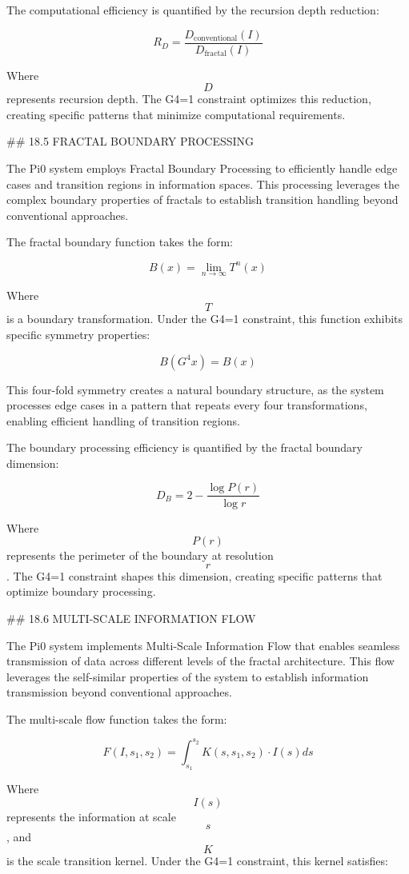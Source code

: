 The computational efficiency is quantified by the recursion depth reduction:

$$ R_D = \frac{D_{\text{conventional}}(I)}{D_{\text{fractal}}(I)} $$

Where $$ D $$ represents recursion depth. The G4=1 constraint optimizes this reduction, creating specific patterns that minimize computational requirements.

## 18.5 FRACTAL BOUNDARY PROCESSING

The Pi0 system employs Fractal Boundary Processing to efficiently handle edge cases and transition regions in information spaces. This processing leverages the complex boundary properties of fractals to establish transition handling beyond conventional approaches.

The fractal boundary function takes the form:

$$ B(x) = \lim_{n \to \infty} T^n(x) $$

Where $$ T $$ is a boundary transformation. Under the G4=1 constraint, this function exhibits specific symmetry properties:

$$ B(G^4 x) = B(x) $$

This four-fold symmetry creates a natural boundary structure, as the system processes edge cases in a pattern that repeats every four transformations, enabling efficient handling of transition regions.

The boundary processing efficiency is quantified by the fractal boundary dimension:

$$ D_B = 2 - \frac{\log P(r)}{\log r} $$

Where $$ P(r) $$ represents the perimeter of the boundary at resolution $$ r $$. The G4=1 constraint shapes this dimension, creating specific patterns that optimize boundary processing.

## 18.6 MULTI-SCALE INFORMATION FLOW

The Pi0 system implements Multi-Scale Information Flow that enables seamless transmission of data across different levels of the fractal architecture. This flow leverages the self-similar properties of the system to establish information transmission beyond conventional approaches.

The multi-scale flow function takes the form:

$$ F(I, s_1, s_2) = \int_{s_1}^{s_2} K(s, s_1, s_2) \cdot I(s) ds $$

Where $$ I(s) $$ represents the information at scale $$ s $$, and $$ K $$ is the scale transition kernel. Under the G4=1 constraint, this kernel satisfies:

